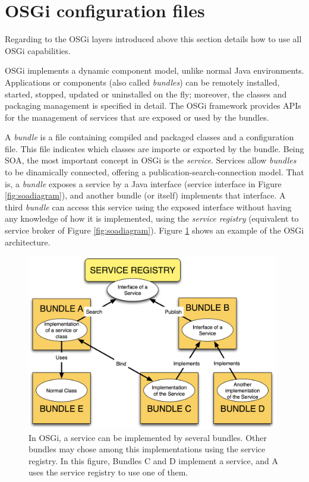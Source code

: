 \section{OSGi configuration files}
Regarding to the OSGi layers introduced above this section details how to use all OSGi capabilities. 

OSGi implements a dynamic component model, unlike normal Java
environments. Applications or components (also called
\emph{bundles}) can be remotely installed, started, stopped, updated
or uninstalled on the fly; moreover, the classes and
packaging management is specified in detail. The OSGi framework provides
APIs for the management of services that are exposed or used by the
bundles.

A {\em bundle} is a file containing compiled and packaged classes and a configuration file. This file indicates which classes are importe or exported by the bundle. Being SOA, the most important concept in OSGi is the {\em service}. Services allow {\em bundles} to be dinamically connected, offering a publication-search-connection model. That is, a {\em bundle} exposes a service by a Java interface (service interface in Figure \ref{fig:soadiagram}), and another bundle (or itself) implements that interface. A third {\em bundle} can access this service using the exposed interface without having any knowledge of how it is implemented, using the {\em service registry} (equivalent to service broker of Figure \ref{fig:soadiagram}). Figure \ref{OSGIDIAGRAM} shows an example of the OSGi architecture.


\begin{figure}
\centering
\includegraphics[width=26pc]{gfx/soa/bundles.jpg}
\caption{In OSGi, a service can be implemented by several bundles. Other bundles may chose among this implementations using the service registry. In this figure, Bundles C and D implement a service, and A uses the service registry to use one of them.}
\label{OSGIDIAGRAM}
\end{figure}



